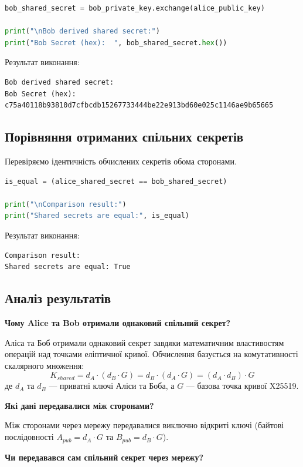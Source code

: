 \begin{lstlisting}[language=Python]
bob_shared_secret = bob_private_key.exchange(alice_public_key)

print("\nBob derived shared secret:")
print("Bob Secret (hex):  ", bob_shared_secret.hex())
\end{lstlisting}

Результат виконання:
\begin{lstlisting}
Bob derived shared secret:
Bob Secret (hex):   c75a40118b93810d7cfbcdb15267733444be22e913bd60e025c1146ae9b65665
\end{lstlisting}

\subsection{Порівняння отриманих спільних секретів}
Перевіряємо ідентичність обчислених секретів обома сторонами.

\begin{lstlisting}[language=Python]
is_equal = (alice_shared_secret == bob_shared_secret)

print("\nComparison result:")
print("Shared secrets are equal:", is_equal)
\end{lstlisting}

Результат виконання:
\begin{lstlisting}
Comparison result:
Shared secrets are equal: True
\end{lstlisting}

\subsection{Аналіз результатів}

\textbf{Чому Alice та Bob отримали однаковий спільний секрет?}

Аліса та Боб отримали однаковий секрет завдяки математичним властивостям операцій над точками еліптичної кривої. Обчислення базується на комутативності скалярного множення:
$$K_{shared} = d_A \cdot (d_B \cdot G) = d_B \cdot (d_A \cdot G) = (d_A \cdot d_B) \cdot G$$
де $d_A$ та $d_B$ --- приватні ключі Аліси та Боба, а $G$ --- базова точка кривої X25519.

\textbf{Які дані передавалися між сторонами?}

Між сторонами через мережу передавалися виключно відкриті ключі (байтові послідовності $A_{pub} = d_A \cdot G$ та $B_{pub} = d_B \cdot G$).

\textbf{Чи передавався сам спільний секрет через мережу?}


